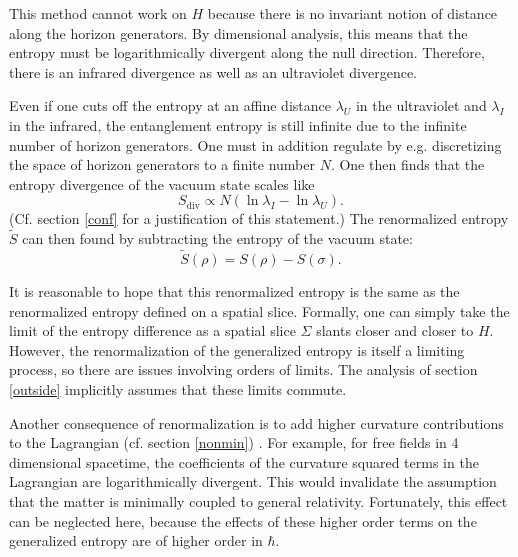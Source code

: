 \documentclass{article}
\begin{document}
This method cannot work on $H$ because there is no invariant notion of distance along the horizon generators.  By dimensional analysis, this means that the entropy must be logarithmically divergent along the null direction.  Therefore, there is an infrared divergence as well as an ultraviolet divergence.

Even if one cuts off the entropy at an affine distance $\lambda_U$ in the ultraviolet and $\lambda_I$ in the infrared, the entanglement entropy is still infinite due to the infinite number of horizon generators.  One must in addition regulate by e.g. discretizing the space of horizon generators to a finite number $N$.  One then finds that the entropy divergence of the vacuum state scales like
\begin{equation}\label{nulldiv}
S_\mathrm{div} \propto N (\ln \lambda_I - \ln \lambda_U).
\end{equation}
(Cf. section \ref{conf} for a justification of this statement.)  The renormalized entropy $\tilde{S}$ can then found by subtracting the entropy of the vacuum state:
\begin{equation}
\tilde{S}(\rho) = S(\rho) - S(\sigma).
\end{equation}

It is reasonable to hope that this renormalized entropy is the same as the renormalized entropy defined on a spatial slice.  Formally, one can simply take the limit of the entropy difference as a spatial slice $\Sigma$ slants closer and closer to $H$.  However, the renormalization of the generalized entropy is itself a limiting process, so there are issues involving orders of limits.  The analysis of section \ref{outside} implicitly assumes that these limits commute.

Another consequence of renormalization is to add higher curvature contributions to the Lagrangian (cf. section \ref{nonmin}) \cite{jacobson94}.  For example, for free fields in 4 dimensional spacetime, the coefficients of the curvature squared terms in the Lagrangian are logarithmically divergent.  This would invalidate the assumption that the matter is minimally coupled to general relativity.  Fortunately, this effect can be neglected here, because the effects of these higher order terms on the generalized entropy are of higher order in $\hbar$.

\end{document}

